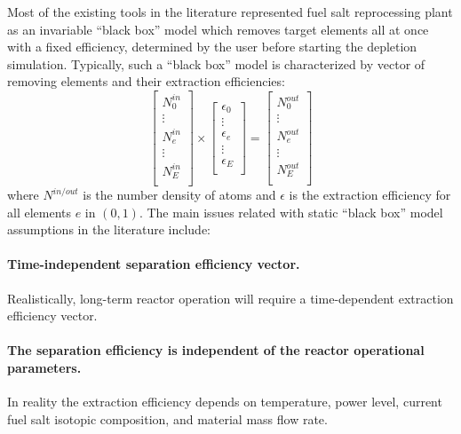Most of the existing tools in the literature represented fuel salt 
reprocessing plant as an invariable ``black box'' model which removes target 
elements all at once with a fixed efficiency, determined by the user before 
starting the depletion simulation. Typically, such a ``black box'' model is 
characterized by vector of removing elements and their extraction efficiencies:
\begin{equation}
\begin{bmatrix}
N^{in}_{0} \\ \vdots \\ N^{in}_{e} \\ \vdots \\ N^{in}_{E} \\
\end{bmatrix} 
\times
\begin{bmatrix}
\epsilon_{0} \\ \vdots \\ \epsilon_{e} \\ \vdots \\ \epsilon_{E} \\
\end{bmatrix} =
\begin{bmatrix}
N^{out}_{0}\\ \vdots \\ N^{out}_{e} \\ \vdots \\N^{out}_{E}  \\
\end{bmatrix}
\end{equation}
where $N^{in/out}$ is the number density of atoms and $\epsilon$ is the 
extraction efficiency for all elements $e$ in $(0, 1)$. The main issues 
related with static ``black box'' model assumptions in the literature include: 
\paragraph{Time-independent separation efficiency vector.} Realistically, 
long-term reactor operation will require a time-dependent extraction 
efficiency vector.
\paragraph{The separation efficiency is independent of the reactor operational 
	parameters.} In reality the extraction efficiency depends on temperature, 
power level, current fuel salt isotopic composition, and material mass 
flow rate.
